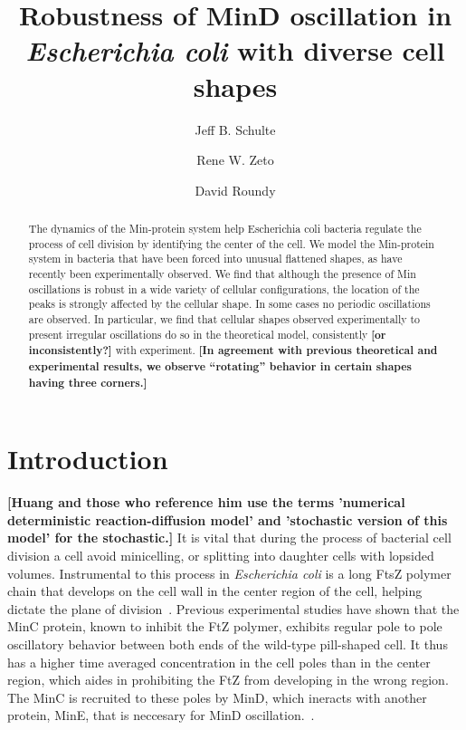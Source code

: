 \documentclass[letterpaper,twocolumn,amsmath,amssymb,pre]{revtex4-1}
\newcommand{\red}[1]{{\bf \color{red} #1}}
\newcommand{\fixme}[1]{\red{[#1]}}
\begin{document}
\title{Robustness of MinD oscillation in \emph{Escherichia coli} with
  diverse cell shapes}

\author{Jeff B. Schulte}
\author{Rene W. Zeto}
\author{David Roundy}

\begin{abstract}
  The dynamics of the Min-protein system help Escherichia coli
  bacteria regulate the process of cell division by identifying the
  center of the cell.  We model the Min-protein system in bacteria
  that have been forced into unusual flattened shapes, as have
  recently been experimentally observed.  We find that although the
  presence of Min oscillations is robust in a wide variety of cellular
  configurations, the location of the peaks is strongly affected by
  the cellular shape.  In some cases no periodic oscillations are
  observed.  In particular, we find that cellular shapes observed
  experimentally to present irregular oscillations do so in the
  theoretical model, consistently \fixme{or inconsistently?} with
  experiment.  \fixme{In agreement with previous theoretical and
    experimental results, we observe ``rotating'' behavior in certain
    shapes having three corners.}
\end{abstract}

\maketitle

\section{Introduction}
\fixme{Huang and those who reference him use the terms 'numerical
  deterministic reaction-diffusion model' and 'stochastic version of
  this model' for the stochastic.} It is vital that during the process
of bacterial cell division a cell avoid minicelling, or splitting into
daughter cells with lopsided volumes.  Instrumental to this process in
\emph{Escherichia coli} is a long FtsZ polymer chain that develops on
the cell wall in the center region of the cell, helping dictate the
plane of
division~\cite{adams2009bacterial,lutkenhaus2007assembly}. Previous
experimental studies have shown that the MinC protein, known to
inhibit the FtZ polymer\cite{shen2010examination}, exhibits regular
pole to pole oscillatory behavior between both ends of the wild-type
pill-shaped cell.  It thus has a higher time averaged concentration in
the cell poles than in the center region, which aides in prohibiting
the FtZ from developing in the wrong region.  The MinC is recruited to
these poles by MinD, which ineracts with another protein, MinE, that
is neccesary for MinD
oscillation.~\cite{hu1999topological,fu2001mine,shapiro2009and,yu1999ftsz,raskin1999rapid,meacci2005min,raskin1999minde}.
\end{document}
